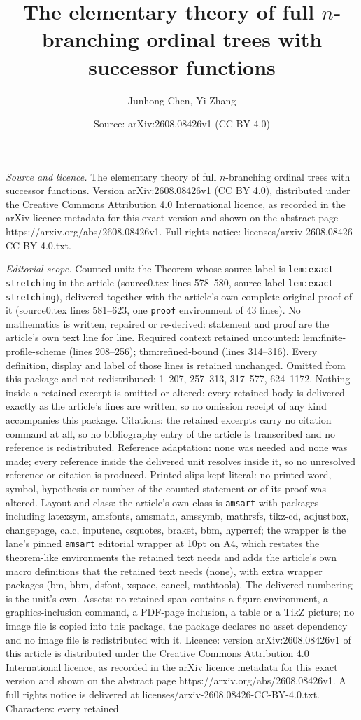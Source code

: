 \documentclass[10pt,a4paper]{amsart}
\title[The elementary theory of full $n$-branching ordinal trees wi]{The elementary theory of full $n$-branching ordinal trees with successor functions}
\author{Junhong Chen, Yi Zhang}
\date{Source: arXiv:2608.08426v1 (CC BY 4.0)}
\begin{document}
\maketitle

\noindent\emph{Source and licence.} The elementary theory of full $n$-branching ordinal trees with successor functions. Version arXiv:2608.08426v1 (CC BY 4.0), distributed under the Creative Commons Attribution 4.0 International licence, as recorded in the arXiv licence metadata for this exact version and shown on the abstract page https://arxiv.org/abs/2608.08426v1. Full rights notice: licenses/arxiv-2608.08426-CC-BY-4.0.txt.\par\smallskip

\noindent\textit{Editorial scope.} Counted unit: the Theorem whose source label is \texttt{lem:exact-stretching} in the article (source0.tex lines 578--580, source label \texttt{lem:exact-stretching}), delivered together with the article's own complete original proof of it (source0.tex lines 581--623, one \texttt{proof} environment of 43 lines). No mathematics is written, repaired or re-derived: statement and proof are the article's own text line for line. Required context retained uncounted: lem:finite-profile-scheme (lines 208--256); thm:refined-bound (lines 314--316). Every definition, display and label of those lines is retained unchanged. Omitted from this package and not redistributed: 1--207, 257--313, 317--577, 624--1172. Nothing inside a retained excerpt is omitted or altered: every retained body is delivered exactly as the article's lines are written, so no omission receipt of any kind accompanies this package. Citations: the retained excerpts carry no citation command at all, so no bibliography entry of the article is transcribed and no reference is redistributed. Reference adaptation: none was needed and none was made; every reference inside the delivered unit resolves inside it, so no unresolved reference or citation is produced. Printed slips kept literal: no printed word, symbol, hypothesis or number of the counted statement or of its proof was altered. Layout and class: the article's own class is \texttt{amsart} with packages including latexsym, amsfonts, amsmath, amssymb, mathrsfs, tikz-cd, adjustbox, changepage, calc, inputenc, csquotes, braket, bbm, hyperref; the wrapper is the lane's pinned \texttt{amsart} editorial wrapper at 10pt on A4, which restates the theorem-like environments the retained text needs and adds the article's own macro definitions that the retained text needs (none), with extra wrapper packages (bm, bbm, dsfont, xspace, cancel, mathtools). The delivered numbering is the unit's own. Assets: no retained span contains a figure environment, a graphics-inclusion command, a PDF-page inclusion, a table or a TikZ picture; no image file is copied into this package, the package declares no asset dependency and no image file is redistributed with it. Licence: version arXiv:2608.08426v1 of this article is distributed under the Creative Commons Attribution 4.0 International licence, as recorded in the arXiv licence metadata for this exact version and shown on the abstract page https://arxiv.org/abs/2608.08426v1. A full rights notice is delivered at licenses/arxiv-2608.08426-CC-BY-4.0.txt. Characters: every retained 
\end{document}
